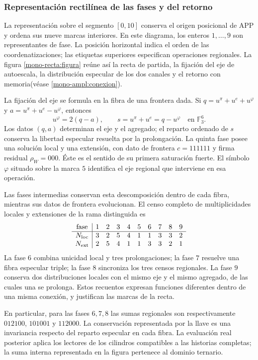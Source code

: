 \subsubsection{Representación rectilínea de las fases y del retorno}
\label{mono-recta:desarrollo}

La representación sobre el segmento \([0,10]\) conserva el origen
posicional de APP y ordena sus nueve marcas interiores. En este diagrama,
los enteros \(1,\ldots,9\) son representantes de fase. La posición
horizontal indica el orden de las coordenatizaciones; las etiquetas superiores
especifican operaciones regionales. La figura
\ref{mono-recta:figura} reúne así la recta de partida, la fijación del
eje de autoescala, la distribución especular de los dos canales y el
retorno con memoria(véase \ref{mono-ampl:conexion}).



La fijación del eje se formula en la fibra de una frontera dada. Si
\(q=u^\pi+u^e+u^\varphi\) y
\(a=u^\pi+u^e-u^\varphi\), entonces
\[
 u^\varphi=2(q-a),\qquad s=u^\pi+u^e=q-u^\varphi
 \quad\text{en }\mathbb F_3^6.
\]
Los datos \((q,a)\) determinan el eje y el agregado; el reparto ordenado
de \(s\) conserva la libertad especular resuelta por la prolongación.
La quinta fase posee una solución local y una extensión, con dato
de frontera \(c=111111\) y firma residual \(\rho_W=000\). Éste es el
sentido de su primera saturación fuerte. El símbolo \(\varphi\)
situado sobre la marca \(5\) identifica el eje regional que interviene
en esa operación.

Las fases intermedias conservan esta descomposición dentro de cada fibra,
mientras sus datos de frontera evolucionan. El censo completo de
multiplicidades locales y extensiones de la rama distinguida es
\[
\begin{array}{c|rrrrrrrrr}
\text{fase}&1&2&3&4&5&6&7&8&9\\\hline
N_{\rm loc}&3&2&5&4&1&1&3&3&2\\
N_{\rm ext}&2&5&4&1&1&3&3&2&1
\end{array}
\]
La fase \(6\) combina unicidad local y tres prolongaciones; la fase
\(7\) resuelve una fibra especular triple; la fase \(8\) sincroniza
los tres censos regionales. La fase \(9\) conserva dos distribuciones
locales con el mismo eje y el mismo agregado, de las cuales una se
prolonga. Estos recuentos expresan funciones diferentes dentro de una
misma conexión, y justifican las marcas de la recta.

En particular, para las fases \(6,7,8\) las sumas regionales son
respectivamente \(012100\), \(101001\) y \(112000\). La conservación
representada por la llave es una invariancia respecto del reparto
especular en cada fibra. La evaluación real posterior aplica los
lectores de los cilindros compatibles a las historias completas; la
suma interna representada en la figura pertenece al dominio ternario.

